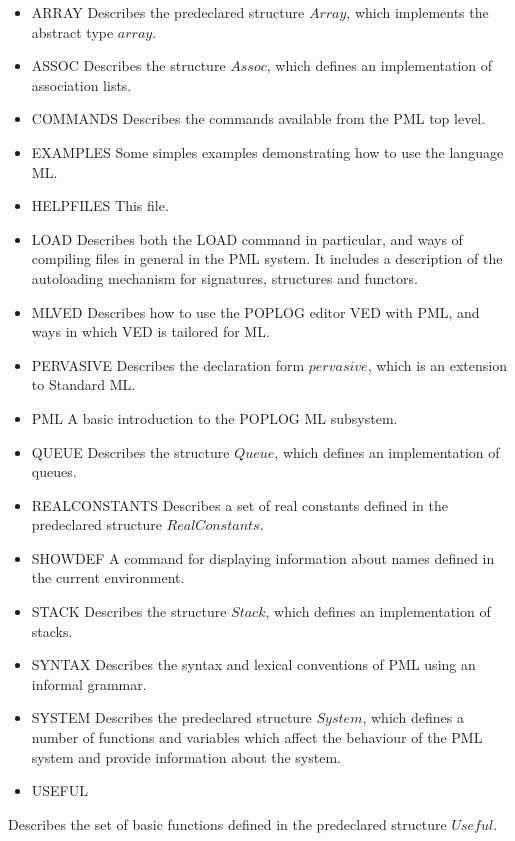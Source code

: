 \begin{itemize}
\item ARRAY
    Describes the predeclared structure $Array$, which implements the
    abstract type $array$.

\item ASSOC
    Describes the structure $Assoc$, which defines an implementation of
    association lists.

\item COMMANDS
    Describes the commands available from the PML top level.

\item EXAMPLES
    Some simples examples demonstrating how to use the language ML.

\item HELPFILES
    This file.

\item LOAD
    Describes both the LOAD command in particular, and ways of compiling
    files in general in the PML system. It includes a description of the
    autoloading mechanism for signatures, structures and functors.

\item MLVED
    Describes how to use the POPLOG editor VED with PML, and ways in
    which VED is tailored for ML.

\item PERVASIVE
    Describes the declaration form $pervasive$, which is an extension to
    Standard ML.

\item PML
    A basic introduction to the POPLOG ML subsystem.

\item QUEUE
    Describes the structure $Queue$, which defines an implementation of
    queues.

\item REALCONSTANTS
    Describes a set of real constants defined in the predeclared
    structure $RealConstants$.

\item SHOWDEF
    A command for displaying information about names defined in the
    current environment.

\item STACK
    Describes the structure $Stack$, which defines an implementation of
    stacks.

\item SYNTAX
    Describes the syntax and lexical conventions of PML using an
    informal grammar.

\item SYSTEM
    Describes the predeclared structure $System$, which defines a number
    of functions and variables which affect the behaviour of the PML
    system and provide information about the system.

\item USEFUL
\end{itemize}
    Describes the set of basic functions defined in the predeclared
    structure $Useful$.




